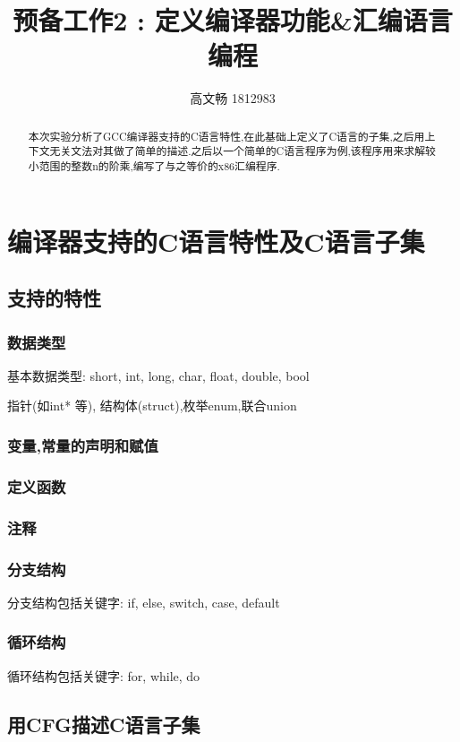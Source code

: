 \documentclass[lang=cn,11pt]{elegantpaper}
\title{预备工作2 : 定义编译器功能\&汇编语言编程}
\author{高文畅 1812983}
\date{}
\begin{document}
	\maketitle
	\begin{abstract}
		本次实验分析了GCC编译器支持的C语言特性,在此基础上定义了C语言的子集,之后用上下文无关文法对其做了简单的描述.之后以一个简单的C语言程序为例,该程序用来求解较小范围的整数n的阶乘,编写了与之等价的x86汇编程序.
	\end{abstract}
	\newpage
	\tableofcontents
	\newpage
	
	\section{编译器支持的C语言特性及C语言子集}
	\subsection{支持的特性}
	\subsubsection{数据类型}
	基本数据类型: short, int, long, char, float, double, bool \par
	指针(如int* 等), 结构体(struct),枚举{enum},联合{union}
	\subsubsection{变量,常量的声明和赋值}
	\subsubsection{定义函数}
	\subsubsection{注释}
	\subsubsection{分支结构}
	分支结构包括关键字: if, else, switch, case, default
	\subsubsection{循环结构}
	循环结构包括关键字: for, while, do
	\subsection{用CFG描述C语言子集}
\end{document}
